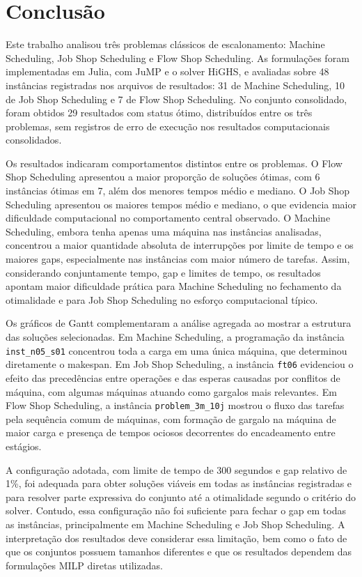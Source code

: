 \section{Conclusão}

Este trabalho analisou três problemas clássicos de escalonamento: Machine
Scheduling, Job Shop Scheduling e Flow Shop Scheduling. As formulações foram
implementadas em Julia, com JuMP e o solver HiGHS, e avaliadas sobre 48
instâncias registradas nos arquivos de resultados: 31 de Machine Scheduling, 10
de Job Shop Scheduling e 7 de Flow Shop Scheduling. No conjunto consolidado,
foram obtidos 29 resultados com status ótimo, distribuídos entre os três
problemas, sem registros de erro de execução nos resultados computacionais
consolidados.

Os resultados indicaram comportamentos distintos entre os problemas. O Flow Shop
Scheduling apresentou a maior proporção de soluções ótimas, com 6 instâncias
ótimas em 7, além dos menores tempos médio e mediano. O Job Shop Scheduling
apresentou os maiores tempos médio e mediano, o que evidencia maior dificuldade
computacional no comportamento central observado. O Machine Scheduling, embora
tenha apenas uma máquina nas instâncias analisadas, concentrou a maior
quantidade absoluta de interrupções por limite de tempo e os maiores gaps,
especialmente nas instâncias com maior número de tarefas. Assim, considerando
conjuntamente tempo, gap e limites de tempo, os resultados apontam maior
dificuldade prática para Machine Scheduling no fechamento da otimalidade e para
Job Shop Scheduling no esforço computacional típico.

Os gráficos de Gantt complementaram a análise agregada ao mostrar a estrutura
das soluções selecionadas. Em Machine Scheduling, a programação da instância
\texttt{inst\_n05\_s01} concentrou toda a carga em uma única máquina, que
determinou diretamente o makespan. Em Job Shop Scheduling, a instância
\texttt{ft06} evidenciou o efeito das precedências entre operações e das esperas
causadas por conflitos de máquina, com algumas máquinas atuando como gargalos
mais relevantes. Em Flow Shop Scheduling, a instância
\texttt{problem\_3m\_10j} mostrou o fluxo das tarefas pela sequência comum de
máquinas, com formação de gargalo na máquina de maior carga e presença de
tempos ociosos decorrentes do encadeamento entre estágios.

A configuração adotada, com limite de tempo de 300 segundos e gap relativo de
1\%, foi adequada para obter soluções viáveis em todas as instâncias registradas
e para resolver parte expressiva do conjunto até a otimalidade segundo o
critério do solver. Contudo, essa configuração não foi suficiente para fechar o
gap em todas as instâncias, principalmente em Machine Scheduling e Job Shop
Scheduling. A interpretação dos resultados deve considerar essa limitação, bem
como o fato de que os conjuntos possuem tamanhos diferentes e que os resultados
dependem das formulações MILP diretas utilizadas.

